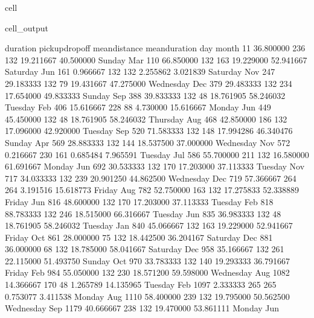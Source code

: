 \documentclass[letterpaper,10pt,english]{sphinxmanual}
\begin{document}
\begin{sphinxuseclass}{cell}
\begin{sphinxuseclass}{cell_output}
\begin{sphinxVerbatim}[commandchars=\\\{\}]
       duration pickup\PYGZus{}dropoff  mean\PYGZus{}distance  mean\PYGZus{}duration        day month  \PYGZbs{}
11    36.800000        236 132      19.211667      40.500000     Sunday   Mar   
110   66.850000        132 163      19.229000      52.941667   Saturday   Jun   
161    0.966667        132 132       2.255862       3.021839   Saturday   Nov   
247   29.183333         132 79      19.431667      47.275000  Wednesday   Dec   
379   29.483333        132 234      17.654000      49.833333     Sunday   Sep   
388   39.833333         132 48      18.761905      58.246032    Tuesday   Feb   
406   15.616667         228 88       4.730000      15.616667     Monday   Jun   
449   45.450000         132 48      18.761905      58.246032   Thursday   Aug   
468   42.850000        186 132      17.096000      42.920000    Tuesday   Sep   
520   71.583333        132 148      17.994286      46.340476     Sunday   Apr   
569   28.883333        132 144      18.537500      37.000000  Wednesday   Nov   
572    0.216667        230 161       0.685484       7.965591    Tuesday   Jul   
586   55.700000        211 132      16.580000      61.691667     Monday   Jun   
692   30.533333        132 170      17.203000      37.113333    Tuesday   Nov   
717   34.033333        132 239      20.901250      44.862500  Wednesday   Dec   
719   57.366667        264 264       3.191516      15.618773     Friday   Aug   
782   52.750000        163 132      17.275833      52.338889     Friday   Jun   
816   48.600000        132 170      17.203000      37.113333    Tuesday   Feb   
818   88.783333        132 246      18.515000      66.316667    Tuesday   Jun   
835   36.983333         132 48      18.761905      58.246032    Tuesday   Jan   
840   45.066667        132 163      19.229000      52.941667     Friday   Oct   
861   28.000000         75 132      18.442500      36.204167   Saturday   Dec   
881   36.000000         68 132      18.785000      58.041667   Saturday   Dec   
958   35.166667        132 261      22.115000      51.493750     Sunday   Oct   
970   33.783333        132 140      19.293333      36.791667     Friday   Feb   
984   55.050000        132 230      18.571200      59.598000  Wednesday   Aug   
1082  14.366667         170 48       1.265789      14.135965    Tuesday   Feb   
1097   2.333333        265 265       0.753077       3.411538     Monday   Aug   
1110  58.400000        239 132      19.795000      50.562500  Wednesday   Sep   
1179  40.666667        238 132      19.470000      53.861111     Monday   Jun   


\end{sphinxVerbatim}
\end{sphinxuseclass}
\end{sphinxuseclass}
\end{document}
